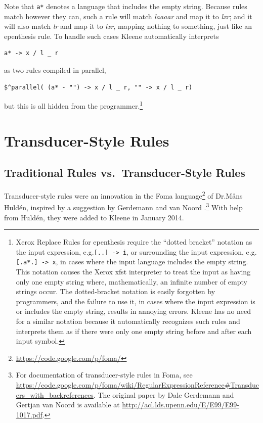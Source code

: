 \noindent
Note that \verb!a*! denotes a language that includes the empty string.
Because rules match however they can, such a rule will match \emph{laaaar} and map it to \emph{lxr}; and it will also
match \emph{lr} and map it to \emph{lxr}, mapping nothing to
something, just like an epenthesis rule.  To handle such cases Kleene
automatically interprets 

\begin{Verbatim}
a* -> x / l _ r
\end{Verbatim}

\noindent
as two rules compiled in parallel, 

\begin{Verbatim}
$^parallel( (a* - "") -> x / l _ r, "" -> x / l _ r)
\end{Verbatim}

\noindent
but this is all hidden from the programmer.\footnote{Xerox Replace Rules for epenthesis require the ``dotted bracket'' notation as
the input expression, e.g.\@  \verb![..] -> i!, or surrounding the input expression, e.g.\@ \verb![.a*.] -> x!, in
cases where the input language includes the empty string.  This notation causes the Xerox xfst interpreter to treat
the input as having only one empty string where, mathematically, an infinite number of empty strings occur.  The
dotted-bracket notation is easily forgotten by programmers, and the failure to use it, in cases where the input
expression is or includes the empty string, results in annoying errors.  Kleene
has no need for a similar notation because it automatically recognizes such rules and interprets them as if there
were only one empty string before and after each input symbol.}

\section{Transducer-Style Rules}

\subsection{Traditional Rules vs.\ Transducer-Style Rules}

Transducer-style rules were an innovation in the Foma language\footnote{\url{https://code.google.com/p/foma/}} of 
Dr.\@ M\r{a}ns Huldén, inspired by a suggestion by Gerdemann and van
Noord
\citep{gerdemann+vannoord:1999}.\footnote{For documentation of transducer-style rules in Foma,
	see
\url{https://code.google.com/p/foma/wiki/RegularExpressionReference#Transducers_with_backreferences}.
The original paper by Dale Gerdemann and Gertjan van Noord is available
at \url{http://acl.lds.upenn.edu/E/E99/E99-1017.pdf}.}  With help from 
Huldén, they were added to Kleene in January 2014.

